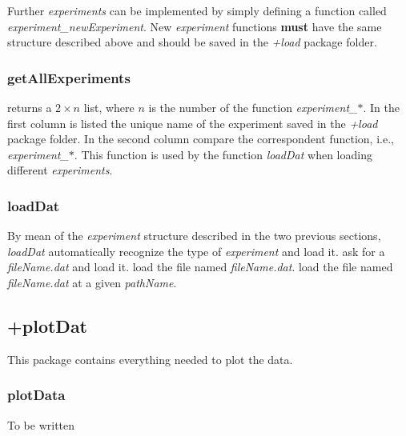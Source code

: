 Further \emph{experiments} can be implemented by simply defining a function called \emph{experiment\_newExperiment}. New \emph{experiment} functions \textbf{must} have the same structure described above and should be saved in the \emph{+load} package folder.

\subsubsection{getAllExperiments}
\bdf
{} returns a $2 \times n$ list, where $n$ is the number of the function \emph{experiment\_$\ast$}.
In the first column is listed the unique name of the experiment saved in the \emph{+load} package folder.
In the second column compare the correspondent function, i.e., \emph{experiment\_$\ast$}.
\edf
This function is used by the function \emph{loadDat} when loading different \emph{experiments}.


\subsubsection{loadDat}
By mean of the \emph{experiment} structure described in the two previous sections, \emph{loadDat} automatically recognize the type of \emph{experiment} and load it.
\bdf
{} ask for a \emph{fileName.dat} and load it.
 load the file named \emph{fileName.dat}.
 load the file named \emph{fileName.dat} at a given \emph{pathName}.
\edf

\subsection{+plotDat}
This package contains everything needed to plot the data.
\subsubsection{plotData}
To be written
%
%
